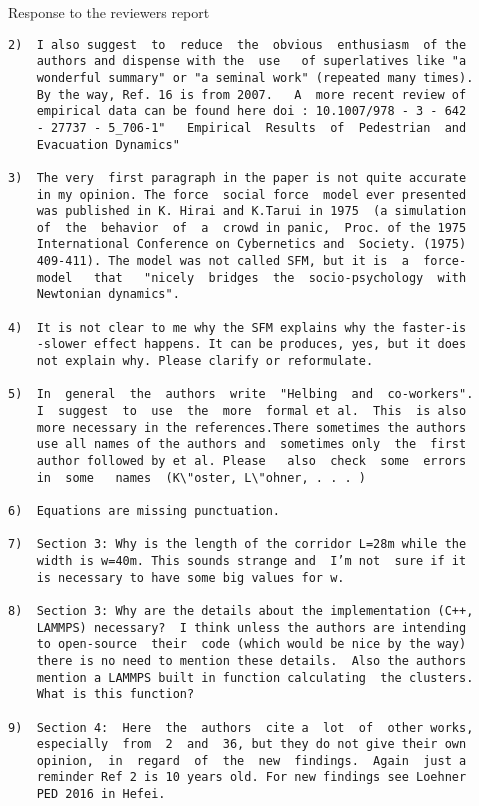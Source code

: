 \documentclass[a4paper,12pt]{letter}
\begin{document}
\begin{letter}{Response to the reviewers report}
\begin{verbatim}
2)  I also suggest  to  reduce  the  obvious  enthusiasm  of the
    authors and dispense with the  use   of superlatives like "a 
    wonderful summary" or "a seminal work" (repeated many times). 
    By the way, Ref. 16 is from 2007.   A  more recent review of
    empirical data can be found here doi : 10.1007/978 - 3 - 642
    - 27737 - 5_706-1"   Empirical  Results  of  Pedestrian  and 
    Evacuation Dynamics"

3)  The very  first paragraph in the paper is not quite accurate
    in my opinion. The force  social force  model ever presented
    was published in K. Hirai and K.Tarui in 1975  (a simulation
    of  the  behavior  of  a  crowd in panic,  Proc. of the 1975 
    International Conference on Cybernetics and  Society. (1975)
    409-411). The model was not called SFM, but it is  a  force-
    model   that   "nicely  bridges  the  socio-psychology  with 
    Newtonian dynamics".

4)  It is not clear to me why the SFM explains why the faster-is
    -slower effect happens. It can be produces, yes, but it does
    not explain why. Please clarify or reformulate.

5)  In  general  the  authors  write  "Helbing  and  co-workers".
    I  suggest  to  use  the  more  formal et al.  This  is also
    more necessary in the references.There sometimes the authors
    use all names of the authors and  sometimes only  the  first
    author followed by et al. Please   also  check  some  errors
    in  some   names  (K\"oster, L\"ohner, . . . )

6)  Equations are missing punctuation.

7)  Section 3: Why is the length of the corridor L=28m while the
    width is w=40m. This sounds strange and  I’m not  sure if it 
    is necessary to have some big values for w.

8)  Section 3: Why are the details about the implementation (C++, 
    LAMMPS) necessary?  I think unless the authors are intending
    to open-source  their  code (which would be nice by the way)
    there is no need to mention these details.  Also the authors
    mention a LAMMPS built in function calculating  the clusters.
    What is this function?

9)  Section 4:  Here  the  authors  cite a  lot  of  other works,
    especially  from  2  and  36, but they do not give their own 
    opinion,  in  regard  of  the  new  findings.  Again  just a 
    reminder Ref 2 is 10 years old. For new findings see Loehner
    PED 2016 in Hefei.


\end{verbatim}
\end{letter}
\end{document}

